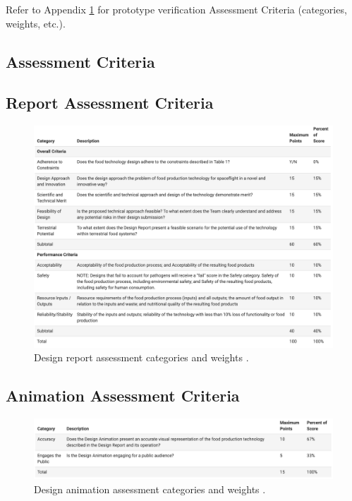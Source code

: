 \documentclass{report}
\begin{document}
Refer to Appendix \ref{sec:assessment} for prototype verification Assessment Criteria (categories, weights, etc.).

\newpage

\begin{appendices}
\section{Assessment Criteria}
\label{sec:assessment}
\subsection{Report Assessment Criteria}
\label{sec:reportassessment}

\begin{figure}[h]
    \centering
    \includegraphics[width=15cm]{images/reportassessment.png}
    \hfill
    \caption{Design report assessment categories and weights \cite{applicantguide}.}
\end{figure}

\subsection{Animation Assessment Criteria}
\label{sec:animassessment}

\begin{figure}[h]
    \centering
    \includegraphics[width=15cm]{images/animassessment.png}
    \hfill
    \caption{Design animation assessment categories and weights \cite{applicantguide}.}
\end{figure}


\end{appendices}
\end{document}
